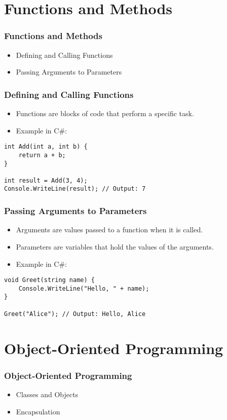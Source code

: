 \documentclass{beamer}
\begin{document}
\section{Functions and Methods}
\begin{frame}
\frametitle{Functions and Methods}
\begin{itemize}
    \item Defining and Calling Functions
    \item Passing Arguments to Parameters
\end{itemize}
\end{frame}

\begin{frame}[fragile]
\frametitle{Defining and Calling Functions}
\begin{itemize}
    \item Functions are blocks of code that perform a specific task.
    \item Example in C\#:
\end{itemize}
\begin{verbatim}
int Add(int a, int b) {
    return a + b;
}

int result = Add(3, 4);
Console.WriteLine(result); // Output: 7
\end{verbatim}
\end{frame}

\begin{frame}[fragile]
\frametitle{Passing Arguments to Parameters}
\begin{itemize}
    \item Arguments are values passed to a function when it is called.
    \item Parameters are variables that hold the values of the arguments.
    \item Example in C\#:
\end{itemize}
\begin{verbatim}
void Greet(string name) {
    Console.WriteLine("Hello, " + name);
}

Greet("Alice"); // Output: Hello, Alice
\end{verbatim}
\end{frame}

\section{Object-Oriented Programming}
\begin{frame}
\frametitle{Object-Oriented Programming}
\begin{itemize}
    \item Classes and Objects
    \item Encapsulation
\end{itemize}
\end{frame}
\end{document}
